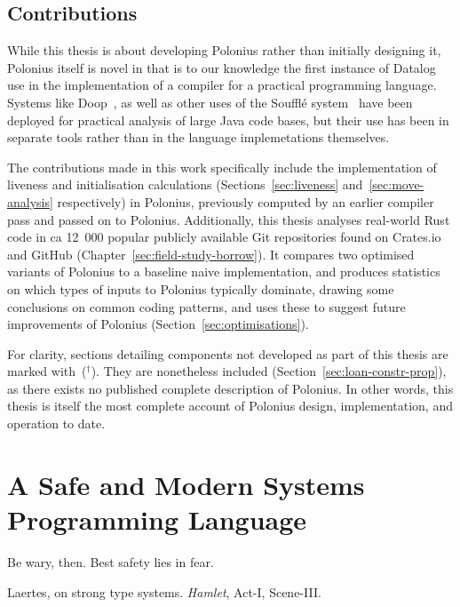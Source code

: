 \documentclass[11pt,a4paper,twoside,openany]{report}
\newcommand{\notmine}[0] {$^\dagger$}
\begin{document}
\section{Contributions}\label{sec:contributions}

While this thesis is about developing Polonius rather than initially designing
it, Polonius itself is novel in that is to our knowledge the first instance of
Datalog use in the implementation of a compiler for a practical programming
language. Systems like Doop~\cite{bravenboer_strictly_2009}, as well as other
uses of the Souffl{\'e} system~\cite{souffle} have been deployed for practical
analysis of large Java code bases, but their use has been in separate tools
rather than in the language implemetations themselves.

The contributions made in this work specifically include the implementation of
liveness and initialisation calculations (Sections~\ref{sec:liveness}
and~\ref{sec:move-analysis} respectively) in Polonius, previously computed by an
earlier compiler pass and passed on to Polonius. Additionally, this thesis
analyses real-world Rust code in ca 12~000 popular publicly available Git
repositories found on Crates.io and GitHub
(Chapter~\ref{sec:field-study-borrow}). It compares two optimised variants of
Polonius to a baseline naive implementation, and produces statistics on which
types of inputs to Polonius typically dominate, drawing some conclusions on
common coding patterns, and uses these to suggest future improvements of
Polonius (Section~\ref{sec:optimisations}).

For clarity, sections detailing components not developed as part of this thesis
are marked with~(\notmine{}). They are nonetheless included
(Section~\ref{sec:loan-constr-prop}), as there exists no published complete
description of Polonius. In other words, this thesis is itself the most complete
account of Polonius design, implementation, and operation to date.

\chapter{A Safe and Modern Systems Programming Language}\label{cha:background}
\epigraph{Be wary, then. Best safety lies in fear.}%
{Laertes, on strong type systems. \textit{Hamlet}, Act-I, Scene-III.}

\end{document}
